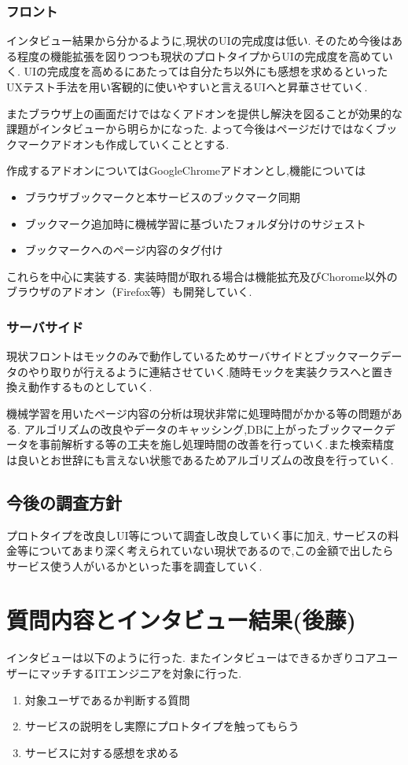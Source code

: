 \documentclass[a4paper,10pt,fleqn]{jsarticle}
\begin{document}
\subsubsection{フロント}
インタビュー結果から分かるように,現状のUIの完成度は低い.
そのため今後はある程度の機能拡張を図りつつも現状のプロトタイプからUIの完成度を高めていく. UIの完成度を高めるにあたっては自分たち以外にも感想を求めるといったUXテスト手法を用い客観的に使いやすいと言えるUIへと昇華させていく.
\par またブラウザ上の画面だけではなくアドオンを提供し解決を図ることが効果的な課題がインタビューから明らかになった. よって今後はページだけではなくブックマークアドオンも作成していくこととする.
\par 作成するアドオンについてはGoogleChromeアドオンとし,機能については
\begin{itemize}
  \item ブラウザブックマークと本サービスのブックマーク同期
  \item ブックマーク追加時に機械学習に基づいたフォルダ分けのサジェスト
  \item ブックマークへのページ内容のタグ付け
\end{itemize}
これらを中心に実装する. 実装時間が取れる場合は機能拡充及びChorome以外のブラウザのアドオン（Firefox等）も開発していく.

\subsubsection{サーバサイド}
現状フロントはモックのみで動作しているためサーバサイドとブックマークデータのやり取りが行えるように連結させていく.随時モックを実装クラスへと置き換え動作するものとしていく.
\par 機械学習を用いたページ内容の分析は現状非常に処理時間がかかる等の問題がある. アルゴリズムの改良やデータのキャッシング,DBに上がったブックマークデータを事前解析する等の工夫を施し処理時間の改善を行っていく.また検索精度は良いとお世辞にも言えない状態であるためアルゴリズムの改良を行っていく.

\subsection{今後の調査方針}
プロトタイプを改良しUI等について調査し改良していく事に加え,
サービスの料金等についてあまり深く考えられていない現状であるので,この金額で出したらサービス使う人がいるかといった事を調査していく.

\section{質問内容とインタビュー結果(後藤)}
インタビューは以下のように行った. またインタビューはできるかぎりコアユーザーにマッチするITエンジニアを対象に行った.
\begin{enumerate}
  \item 対象ユーザであるか判断する質問
  \item サービスの説明をし実際にプロトタイプを触ってもらう
  \item サービスに対する感想を求める
\end{enumerate}
\end{document}

